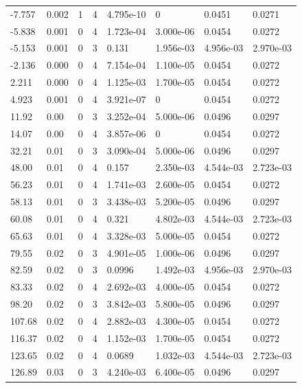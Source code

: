 \documentclass[preview]{standalone}
\begin{document}
{{\begin{tabular}{L{1.2cm}C{1.2cm} C{0.3cm}C{0.5cm} C{1.4cm}C{1.4cm} C{1.4cm}C{1.4cm}}
  -7.757  &  0.002  & 1     &  4 &  4.795e-10  & 0  & 0.0451 &  0.0271   \\ 
  -5.838  &  0.001  & 0     &  4 &  1.723e-04  & 3.000e-06  & 0.0454 &  0.0272   \\ 
  -5.153  &  0.001  & 0     &  3 &  0.131  & 1.956e-03  & 4.956e-03 &  2.970e-03   \\ 
  -2.136  &  0.000  & 0     &  4 &  7.154e-04  & 1.100e-05  & 0.0454 &  0.0272   \\ 
  2.211  &  0.000  & 0     &  4 &  1.125e-03  & 1.700e-05  & 0.0454 &  0.0272   \\ 
  4.923  &  0.001  & 0     &  4 &  3.921e-07  & 0  & 0.0454 &  0.0272   \\ 
  11.92  &  0.00  & 0     &  3 &  3.252e-04  & 5.000e-06  & 0.0496 &  0.0297   \\ 
  14.07  &  0.00  & 0     &  4 &  3.857e-06  & 0  & 0.0454 &  0.0272   \\ 
  32.21  &  0.01  & 0     &  3 &  3.090e-04  & 5.000e-06  & 0.0496 &  0.0297   \\ 
  48.00  &  0.01  & 0     &  4 &  0.157  & 2.350e-03  & 4.544e-03 &  2.723e-03   \\ 
  56.23  &  0.01  & 0     &  4 &  1.741e-03  & 2.600e-05  & 0.0454 &  0.0272   \\ 
  58.13  &  0.01  & 0     &  3 &  3.438e-03  & 5.200e-05  & 0.0496 &  0.0297   \\ 
  60.08  &  0.01  & 0     &  4 &  0.321  & 4.802e-03  & 4.544e-03 &  2.723e-03   \\ 
  65.63  &  0.01  & 0     &  4 &  3.328e-03  & 5.000e-05  & 0.0454 &  0.0272   \\ 
  79.55  &  0.02  & 0     &  3 &  4.901e-05  & 1.000e-06  & 0.0496 &  0.0297   \\ 
  82.59  &  0.02  & 0     &  3 &  0.0996  & 1.492e-03  & 4.956e-03 &  2.970e-03   \\ 
  83.33  &  0.02  & 0     &  4 &  2.692e-03  & 4.000e-05  & 0.0454 &  0.0272   \\ 
  98.20  &  0.02  & 0     &  3 &  3.842e-03  & 5.800e-05  & 0.0496 &  0.0297   \\ 
  107.68  &  0.02  & 0     &  4 &  2.882e-03  & 4.300e-05  & 0.0454 &  0.0272   \\ 
  116.37  &  0.02  & 0     &  4 &  1.152e-03  & 1.700e-05  & 0.0454 &  0.0272   \\ 
  123.65  &  0.02  & 0     &  4 &  0.0689  & 1.032e-03  & 4.544e-03 &  2.723e-03   \\ 
  126.89  &  0.03  & 0     &  3 &  4.240e-03  & 6.400e-05  & 0.0496 &  0.0297   \\ 

\end{tabular}}}
\end{document}

